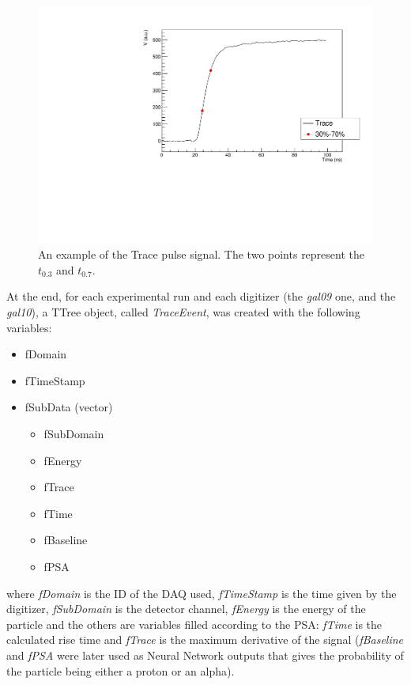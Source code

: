 \begin{figure}[h]
  \centering
  \includegraphics[scale=.6]{img/example_pulse.pdf}
  \caption{An example of the Trace pulse signal. The two points represent the $t_{0.3}$ and $t_{0.7}$.}
  \label{pulse}
\end{figure}

\bigbreak

At the end, for each experimental run and each digitizer (the \textit{gal09}
one, and the \textit{gal10}), a TTree object, called \textit{TraceEvent}, was created with the following variables:

\begin{itemize}
\item fDomain
\item fTimeStamp
\item fSubData (vector)
  \begin{itemize}
  \item fSubDomain
  \item fEnergy
  \item fTrace
  \item fTime
  \item fBaseline
  \item fPSA
  \end{itemize}
\end{itemize}
where \textit{fDomain} is the ID of the DAQ used, \textit{fTimeStamp} is the
time given by the digitizer, \textit{fSubDomain} is the detector channel,
\textit{fEnergy} is the energy of the particle and the others are variables
filled according to the PSA: \textit{fTime} is the calculated rise time and
\textit{fTrace} is the maximum derivative of the signal (\textit{fBaseline} and
\textit{fPSA} were later used as Neural Network outputs that gives the
probability of the particle being either a proton or an alpha).

